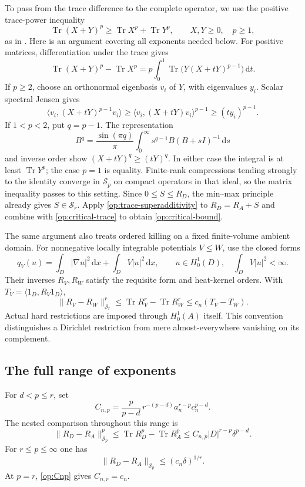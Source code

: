 \documentclass[11pt,reqno]{amsart}
\numberwithin{equation}{section}
\newcommand{\dd}{\,\mathrm d}
\newcommand{\abs}[1]{\lvert#1\rvert}
\newcommand{\norm}[1]{\lVert#1\rVert}
\DeclareMathOperator{\Tr}{Tr}
\begin{document}
To pass from the trace difference to the complete operator, we use
the positive trace-power inequality
\begin{equation}\label{op:trace-superadditivity}
 \Tr(X+Y)^p\ge\Tr X^p+\Tr Y^p,
 \qquad X,Y\ge0,\quad p\ge1,
\end{equation}
as in \cite[Proposition~4.6(ii)]{FackKosaki1986}.
Here is an argument covering all exponents needed below.  For
positive matrices, differentiation under the trace gives
\[
 \Tr(X+Y)^p-\Tr X^p
 =p\int_0^1\Tr\bigl(Y(X+tY)^{p-1}\bigr)\dd t.
\]
If $p\ge2$, choose an orthonormal eigenbasis $v_i$ of $Y$, with
eigenvalues $y_i$.  Scalar spectral Jensen gives
\[
 \langle v_i,(X+tY)^{p-1}v_i\rangle
 \ge\langle v_i,(X+tY)v_i\rangle^{p-1}
 \ge(ty_i)^{p-1}.
\]
If $1<p<2$, put $q=p-1$.  The representation
\[
 B^q=\frac{\sin(\pi q)}\pi
       \int_0^\infty s^{q-1}B(B+sI)^{-1}\dd s
\]
and inverse order show $(X+tY)^q\ge(tY)^q$.
In either case the integral is at least $\Tr Y^p$; the case
$p=1$ is equality.  Finite-rank compressions tending strongly to
the identity converge in $\mathcal S_p$ on compact operators in
that ideal, so the matrix inequality passes to this setting.
Since $0\le S\le R_D$, the min--max principle already gives
$S\in\mathcal S_r$.  Apply \eqref{op:trace-superadditivity} to
$R_D=R_A+S$ and combine with \eqref{op:critical-trace} to obtain
\eqref{op:critical-bound}.

The same argument also treats ordered killing on a fixed
finite-volume ambient domain.  For nonnegative locally integrable
potentials $V\le W$, use the closed forms
\[
 q_V(u)=\int_D\abs{\nabla u}^2\dd x+\int_D V\abs u^2\dd x,
 \qquad
 u\in H_0^1(D),\quad\int_D V\abs u^2<\infty.
\]
Their inverses $R_V,R_W$ satisfy the requisite form and heat-kernel
orders.  With $T_V=\langle1_D,R_V1_D\rangle$,
\begin{equation}\label{op:ordered-killing}
 \norm{R_V-R_W}_{\mathcal S_r}^r
 \le\Tr R_V^r-\Tr R_W^r\le c_n(T_V-T_W).
\end{equation}
Actual hard restrictions are imposed through $H_0^1(A)$ itself.
This convention distinguishes a Dirichlet restriction from mere
almost-everywhere vanishing on its complement.

\subsection{The full range of exponents}
\label{op:range}

For $d<p\le r$, set
\begin{equation}\label{op:Cnp}
 C_{n,p}=\frac{p}{p-d}\,r^{-(p-d)}a_n^{r-p}c_n^{p-d}.
\end{equation}
The nested comparison throughout this range is
\begin{equation}\label{op:range-nested}
 \boxed{\quad
 \norm{R_D-R_A}_{\mathcal S_p}^{p}
 \le\Tr R_D^p-\Tr R_A^p
 \le C_{n,p}\abs D^{r-p}\delta^{p-d}.
 \quad}
\end{equation}
For $r\le p\le\infty$ one has
\begin{equation}\label{op:range-upper}
 \norm{R_D-R_A}_{\mathcal S_p}\le(c_n\delta)^{1/r}.
\end{equation}
At $p=r$, \eqref{op:Cnp} gives $C_{n,r}=c_n$.
\end{document}
